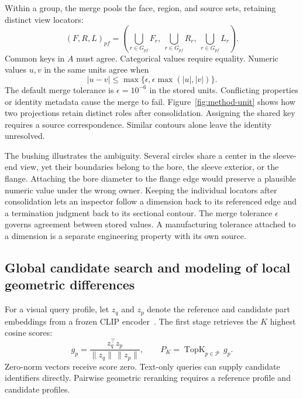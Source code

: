 Within a group, the merge pools the face, region, and source sets, retaining distinct view locators:
\begin{equation}
 (F,R,L)_{pf}=
 \left(\bigcup_{r\in G_{pf}}F_r,\ \bigcup_{r\in G_{pf}}R_r,\
       \bigcup_{r\in G_{pf}}L_r\right).
\end{equation}
Common keys in $A$ must agree. Categorical values require equality. Numeric values $u,v$ in the same units agree when
\begin{equation}
 |u-v|\le \max\{\epsilon,\epsilon\max(|u|,|v|)\}.
\end{equation}
The default merge tolerance is $\epsilon=10^{-6}$ in the stored units. Conflicting properties or identity metadata cause the merge to fail. Figure~\ref{fig:method-unit} shows how two projections retain distinct roles after consolidation. Assigning the shared key requires a source correspondence. Similar contours alone leave the identity unresolved.

The bushing illustrates the ambiguity. Several circles share a center in the sleeve-end view, yet their boundaries belong to the bore, the sleeve exterior, or the flange. Attaching the bore diameter to the flange edge would preserve a plausible numeric value under the wrong owner. Keeping the individual locators after consolidation lets an inspector follow a dimension back to its referenced edge and a termination judgment back to its sectional contour. The merge tolerance $\epsilon$ governs agreement between stored values. A manufacturing tolerance attached to a dimension is a separate engineering property with its own source.

\subsection{Global candidate search and modeling of local geometric differences}
\label{sec:method-rank}
For a visual query profile, let $z_q$ and $z_p$ denote the reference and candidate part embeddings from a frozen CLIP encoder~\cite{radford2021clip}. The first stage retrieves the $K$ highest cosine scores:
\begin{equation}
 g_p=\frac{z_q^\top z_p}{\|z_q\|\,\|z_p\|},\qquad
 P_K=\operatorname{TopK}_{p\in\mathcal P}\,g_p .
\end{equation}
Zero-norm vectors receive score zero. Text-only queries can supply candidate identifiers directly. Pairwise geometric reranking requires a reference profile and candidate profiles.

